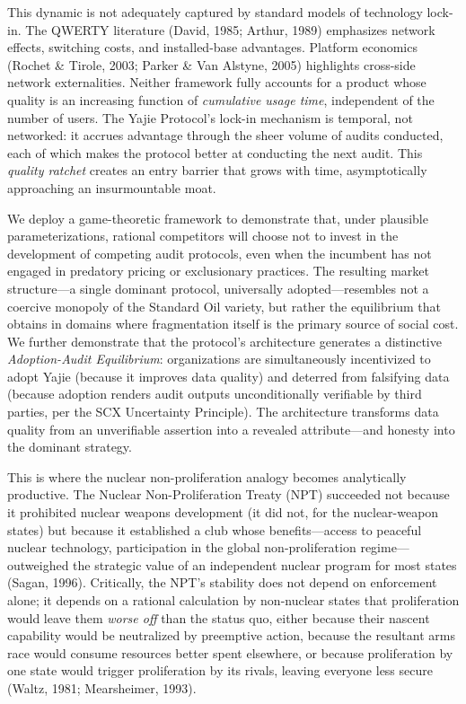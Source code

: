 \documentclass[12pt,a4paper]{ctexart}
\theoremstyle{definition}
\theoremstyle{remark}
\begin{document}
This dynamic is not adequately captured by standard models of technology lock-in. The QWERTY literature (David, 1985; Arthur, 1989) emphasizes network effects, switching costs, and installed-base advantages. Platform economics (Rochet \& Tirole, 2003; Parker \& Van Alstyne, 2005) highlights cross-side network externalities. Neither framework fully accounts for a product whose quality is an increasing function of \textit{cumulative usage time}, independent of the number of users. The Yajie Protocol's lock-in mechanism is temporal, not networked: it accrues advantage through the sheer volume of audits conducted, each of which makes the protocol better at conducting the next audit. This \textit{quality ratchet} creates an entry barrier that grows with time, asymptotically approaching an insurmountable moat.

We deploy a game-theoretic framework to demonstrate that, under plausible parameterizations, rational competitors will choose not to invest in the development of competing audit protocols, even when the incumbent has not engaged in predatory pricing or exclusionary practices. The resulting market structure—a single dominant protocol, universally adopted—resembles not a coercive monopoly of the Standard Oil variety, but rather the equilibrium that obtains in domains where fragmentation itself is the primary source of social cost. We further demonstrate that the protocol's architecture generates a distinctive \textit{Adoption-Audit Equilibrium}: organizations are simultaneously incentivized to adopt Yajie (because it improves data quality) and deterred from falsifying data (because adoption renders audit outputs unconditionally verifiable by third parties, per the SCX Uncertainty Principle). The architecture transforms data quality from an unverifiable assertion into a revealed attribute—and honesty into the dominant strategy.

This is where the nuclear non-proliferation analogy becomes analytically productive. The Nuclear Non-Proliferation Treaty (NPT) succeeded not because it prohibited nuclear weapons development (it did not, for the nuclear-weapon states) but because it established a club whose benefits—access to peaceful nuclear technology, participation in the global non-proliferation regime—outweighed the strategic value of an independent nuclear program for most states (Sagan, 1996). Critically, the NPT's stability does not depend on enforcement alone; it depends on a rational calculation by non-nuclear states that proliferation would leave them \textit{worse off} than the status quo, either because their nascent capability would be neutralized by preemptive action, because the resultant arms race would consume resources better spent elsewhere, or because proliferation by one state would trigger proliferation by its rivals, leaving everyone less secure (Waltz, 1981; Mearsheimer, 1993).
\end{document}
